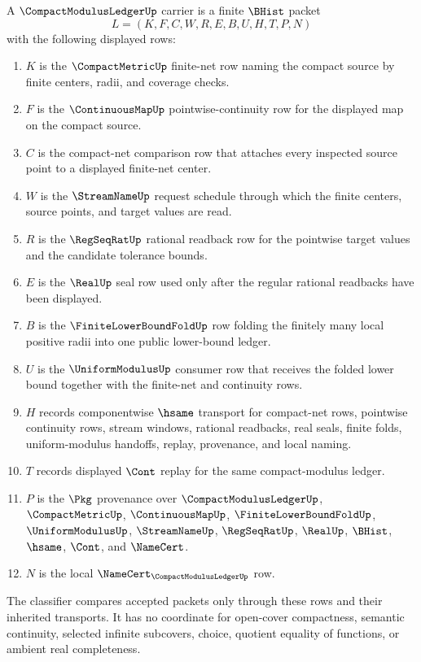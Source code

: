 \begin{definition}
\label{def:compact-modulus-ledger-carrier}
A $\CompactModulusLedgerUp$ carrier is a finite $\BHist$ packet
$$
L=(K,F,C,W,R,E,B,U,H,T,P,N)
$$
with the following displayed rows:
\begin{enumerate}
\item $K$ is the $\CompactMetricUp$ finite-net row naming the compact source by finite centers, radii, and coverage checks.
\item $F$ is the $\ContinuousMapUp$ pointwise-continuity row for the displayed map on the compact source.
\item $C$ is the compact-net comparison row that attaches every inspected source point to a displayed finite-net center.
\item $W$ is the $\StreamNameUp$ request schedule through which the finite centers, source points, and target values are read.
\item $R$ is the $\RegSeqRatUp$ rational readback row for the pointwise target values and the candidate tolerance bounds.
\item $E$ is the $\RealUp$ seal row used only after the regular rational readbacks have been displayed.
\item $B$ is the $\FiniteLowerBoundFoldUp$ row folding the finitely many local positive radii into one public lower-bound ledger.
\item $U$ is the $\UniformModulusUp$ consumer row that receives the folded lower bound together with the finite-net and continuity rows.
\item $H$ records componentwise $\hsame$ transport for compact-net rows, pointwise continuity rows, stream windows, rational readbacks, real seals, finite folds, uniform-modulus handoffs, replay, provenance, and local naming.
\item $T$ records displayed $\Cont$ replay for the same compact-modulus ledger.
\item $P$ is the $\Pkg$ provenance over $\CompactModulusLedgerUp$, $\CompactMetricUp$, $\ContinuousMapUp$, $\FiniteLowerBoundFoldUp$, $\UniformModulusUp$, $\StreamNameUp$, $\RegSeqRatUp$, $\RealUp$, $\BHist$, $\hsame$, $\Cont$, and $\NameCert$.
\item $N$ is the local $\NameCert_{\CompactModulusLedgerUp}$ row.
\end{enumerate}
The classifier compares accepted packets only through these rows and their inherited transports. It has no coordinate for open-cover compactness, semantic continuity, selected infinite subcovers, choice, quotient equality of functions, or ambient real completeness.
\end{definition}

